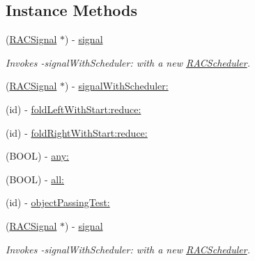 \subsection*{Instance Methods}
\begin{DoxyCompactItemize}
\item 
\mbox{\label{interface_r_a_c_sequence_a4033e6090ad2f5f2ac50a125aa8fd66a}} 
(\mbox{\hyperlink{interface_r_a_c_signal}{R\+A\+C\+Signal}} $\ast$) -\/ \mbox{\hyperlink{interface_r_a_c_sequence_a4033e6090ad2f5f2ac50a125aa8fd66a}{signal}}
\begin{DoxyCompactList}\small\item\em Invokes -\/signal\+With\+Scheduler\+: with a new \mbox{\hyperlink{interface_r_a_c_scheduler}{R\+A\+C\+Scheduler}}. \end{DoxyCompactList}\item 
(\mbox{\hyperlink{interface_r_a_c_signal}{R\+A\+C\+Signal}} $\ast$) -\/ \mbox{\hyperlink{interface_r_a_c_sequence_ac2b08c9ed5f9cae5c96f61578e9c3f5d}{signal\+With\+Scheduler\+:}}
\item 
(id) -\/ \mbox{\hyperlink{interface_r_a_c_sequence_a75b99901f0b8566a49eaee2099df7738}{fold\+Left\+With\+Start\+:reduce\+:}}
\item 
(id) -\/ \mbox{\hyperlink{interface_r_a_c_sequence_abc932140e0279336ed6829b6f91b577e}{fold\+Right\+With\+Start\+:reduce\+:}}
\item 
(B\+O\+OL) -\/ \mbox{\hyperlink{interface_r_a_c_sequence_abbd3bd6ea0a255fe346d8430b2cc586c}{any\+:}}
\item 
(B\+O\+OL) -\/ \mbox{\hyperlink{interface_r_a_c_sequence_a1042435c369460def379265597a1cfb0}{all\+:}}
\item 
(id) -\/ \mbox{\hyperlink{interface_r_a_c_sequence_a38ac274b6fbd87f0ea24f32d1a2d766b}{object\+Passing\+Test\+:}}
\item 
\mbox{\label{interface_r_a_c_sequence_a4033e6090ad2f5f2ac50a125aa8fd66a}} 
(\mbox{\hyperlink{interface_r_a_c_signal}{R\+A\+C\+Signal}} $\ast$) -\/ \mbox{\hyperlink{interface_r_a_c_sequence_a4033e6090ad2f5f2ac50a125aa8fd66a}{signal}}
\begin{DoxyCompactList}\small\item\em Invokes -\/signal\+With\+Scheduler\+: with a new \mbox{\hyperlink{interface_r_a_c_scheduler}{R\+A\+C\+Scheduler}}. \end{DoxyCompactList}\item 

\end{DoxyCompactItemize}
